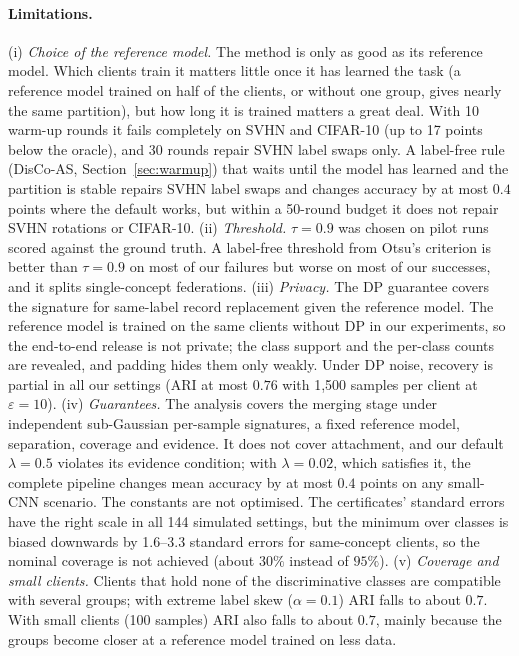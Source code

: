 \paragraph{Limitations.}
(i) \emph{Choice of the reference model.} The method is only as good as its reference model. Which clients train it matters little once it has learned the task (a reference model trained on half of the clients, or without one group, gives nearly the same partition), but how long it is trained matters a great deal. With 10 warm-up rounds it fails completely on SVHN and CIFAR-10 (up to 17 points below the oracle), and 30 rounds repair SVHN label swaps only. A label-free rule (DisCo-AS, Section~\ref{sec:warmup}) that waits until the model has learned and the partition is stable repairs SVHN label swaps and changes accuracy by at most $0.4$ points where the default works, but within a 50-round budget it does not repair SVHN rotations or CIFAR-10.
(ii) \emph{Threshold.} $\tau=0.9$ was chosen on pilot runs scored against the ground truth. A label-free threshold from Otsu's criterion is better than $\tau=0.9$ on most of our failures but worse on most of our successes, and it splits single-concept federations.
(iii) \emph{Privacy.} The DP guarantee covers the signature for same-label record replacement given the reference model. The reference model is trained on the same clients without DP in our experiments, so the end-to-end release is not private; the class support and the per-class counts are revealed, and padding hides them only weakly. Under DP noise, recovery is partial in all our settings (ARI at most $0.76$ with 1{,}500 samples per client at $\varepsilon=10$).
(iv) \emph{Guarantees.} The analysis covers the merging stage under independent sub-Gaussian per-sample signatures, a fixed reference model, separation, coverage and evidence. It does not cover attachment, and our default $\lambda=0.5$ violates its evidence condition; with $\lambda=0.02$, which satisfies it, the complete pipeline changes mean accuracy by at most $0.4$ points on any small-CNN scenario. The constants are not optimised. The certificates' standard errors have the right scale in all 144 simulated settings, but the minimum over classes is biased downwards by 1.6--3.3 standard errors for same-concept clients, so the nominal coverage is not achieved (about $30\%$ instead of $95\%$).
(v) \emph{Coverage and small clients.} Clients that hold none of the discriminative classes are compatible with several groups; with extreme label skew ($\alpha=0.1$) ARI falls to about $0.7$. With small clients (100 samples) ARI also falls to about $0.7$, mainly because the groups become closer at a reference model trained on less data.
